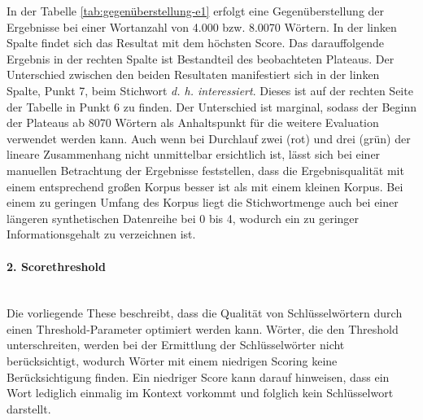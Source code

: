 In der Tabelle \ref{tab:gegenüberstellung-e1} erfolgt eine Gegenüberstellung der Ergebnisse bei einer Wortanzahl von 4.000 bzw. 8.0070 Wörtern. In der linken Spalte findet sich das Resultat mit dem höchsten Score. Das darauffolgende Ergebnis in der rechten Spalte ist Bestandteil des beobachteten Plateaus. Der Unterschied zwischen den beiden Resultaten manifestiert sich in der linken Spalte, Punkt 7, beim Stichwort \emph{d. h. interessiert}. Dieses ist auf der rechten Seite der Tabelle in Punkt 6 zu finden. Der Unterschied ist marginal, sodass der Beginn der Plateaus ab 8070 Wörtern als Anhaltspunkt für die weitere Evaluation verwendet werden kann. Auch wenn bei Durchlauf zwei (rot) und drei (grün) der lineare Zusammenhang nicht unmittelbar ersichtlich ist, lässt sich bei einer manuellen Betrachtung der Ergebnisse feststellen, dass die Ergebnisqualität mit einem entsprechend großen Korpus besser ist als mit einem kleinen Korpus. Bei einem zu geringen Umfang des Korpus liegt die Stichwortmenge auch bei einer längeren synthetischen Datenreihe bei 0 bis 4, wodurch ein zu geringer Informationsgehalt zu verzeichnen ist.
\paragraph{2. Scorethreshold}\mbox{}\\
Die vorliegende These beschreibt, dass die Qualität von Schlüsselwörtern durch einen Threshold-Parameter optimiert werden kann. Wörter, die den Threshold unterschreiten, werden bei der Ermittlung der Schlüsselwörter nicht berücksichtigt, wodurch Wörter mit einem niedrigen Scoring keine Berücksichtigung finden. Ein niedriger Score kann darauf hinweisen, dass ein Wort lediglich einmalig im Kontext vorkommt und folglich kein Schlüsselwort darstellt.\\

